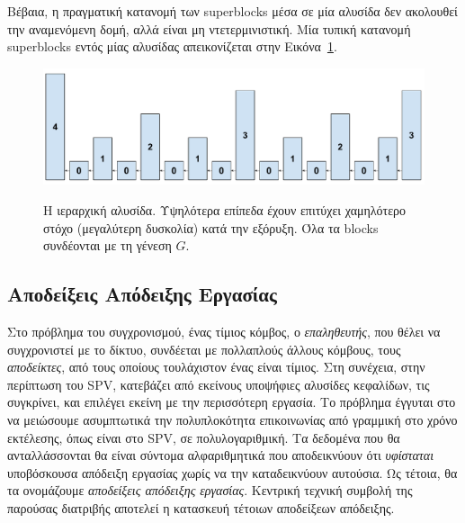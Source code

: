 Βέβαια, η πραγματική κατανομή των superblocks μέσα σε μία αλυσίδα δεν ακολουθεί την αναμενόμενη δομή,
αλλά είναι μη ντετερμινιστική. Μία τυπική κατανομή superblocks εντός μίας αλυσίδας απεικονίζεται στην
Εικόνα~\ref{fig.hierarchy}.

\begin{figure}
  \caption{Η ιεραρχική αλυσίδα.
  Υψηλότερα επίπεδα έχουν επιτύχει χαμηλότερο στόχο (μεγαλύτερη δυσκολία) κατά την
  εξόρυξη. Όλα τα blocks συνδέονται με τη γένεση $G$.}
  \centering
  \includegraphics[width=0.7\columnwidth,keepaspectratio]{chapters/work/figures/hierarchical-chain-tall.pdf}
  \label{fig.hierarchy}
\end{figure}

\subsection*{Αποδείξεις Απόδειξης Εργασίας}

Στο πρόβλημα του συγχρονισμού, ένας τίμιος κόμβος, ο \emph{επαληθευτής}, που θέλει να συγχρονιστεί με το δίκτυο,
συνδέεται με πολλαπλούς άλλους κόμβους, τους \emph{αποδείκτες}, από τους
οποίους τουλάχιστον ένας είναι τίμιος. Στη συνέχεια, στην περίπτωση του SPV, κατεβάζει από εκείνους
υποψήφιες αλυσίδες κεφαλίδων, τις συγκρίνει, και επιλέγει εκείνη με την περισσότερη εργασία. Το
πρόβλημα έγγυται στο να μειώσουμε ασυμπτωτικά την πολυπλοκότητα επικοινωνίας από γραμμική στο χρόνο
εκτέλεσης, όπως είναι στο SPV, σε πολυλογαριθμική. Τα δεδομένα που θα ανταλλάσσονται θα είναι σύντομα
αλφαριθμητικά που αποδεικνύουν ότι \emph{υφίσταται} υποβόσκουσα απόδειξη εργασίας χωρίς να την καταδεικνύουν
αυτούσια. Ως τέτοια, θα τα ονομάζουμε \emph{αποδείξεις απόδειξης εργασίας}. Κεντρική τεχνική συμβολή της
παρούσας διατριβής αποτελεί η κατασκευή τέτοιων αποδείξεων απόδειξης.

